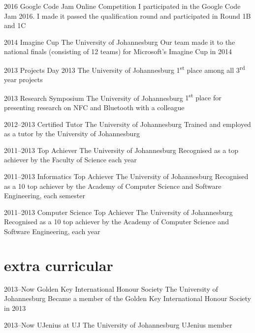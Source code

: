 \documentclass[]{friggeri-cv} %
\begin{document}
\begin{entrylist}

\entry
{2016}
{Google Code Jam}
{Online Competition}
{I participated in the Google Code Jam 2016. I made it passed the qualification round and participated in Round 1B and 1C}

\entry
{2014}
{Imagine Cup}
{The University of Johannesburg}
{Our team made it to the national finals (consisting of 12 teams) for Microsoft's Imagine Cup in 2014}

\entry
{2013}
{Projects Day 2013}
{The University of Johannesburg}
{1\textsuperscript{st} place among all 3\textsuperscript{rd} year projects}

\entry
{2013}
{Research Symposium}
{The University of Johannesburg}
{1\textsuperscript{st} place for presenting research on NFC and Bluetooth with a colleague}

\entry
{2012--2013}
{Certified Tutor}
{The University of Johannesburg}
{Trained and employed as a tutor by the University of Johannesburg}

\entry
{2011--2013}
{Top Achiever}
{The University of Johannesburg}
{Recognised as a top achiever by the Faculty of Science each year}

\entry
{2011--2013}
{Informatics Top Achiever}
{The University of Johannesburg}
{Recognised as a 10 top achiever by the Academy of Computer Science and Software Engineering, each semester}

\entry
{2011--2013}
{Computer Science Top Achiever}
{The University of Johannesburg}
{Recognised as a 10 top achiever by the Academy of Computer Science and Software Engineering, each year}

\end{entrylist}


\section{extra curricular}

\begin{entrylist}

\entry
{2013--Now}
{Golden Key International Honour Society}
{The University of Johannesburg}
{Became a member of the Golden Key International Honour Society in 2013}

\entry
{2013--Now}
{UJenius at UJ}
{The University of Johannesburg}
{UJenius member}

\end{entrylist}
\end{document}

